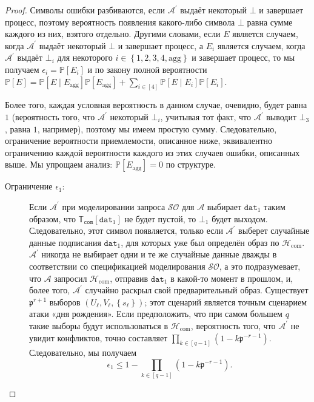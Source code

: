 \documentclass{mrl}
\theoremstyle{definition}
\numberwithin{theorem}{subsection}
\newcommand{\adversary}{\mathcal{A}}
\newcommand{\p}{\mathfrak{p}}
\begin{document}
\begin{proof}
Символы ошибки разбиваются, если $\adversary^\prime$ выдаёт некоторый $\bot$ и завершает процесс, поэтому вероятность появления какого-либо символа $\bot$ равна сумме каждого из них, взятого отдельно. Другими словами, если $E$ является случаем, когда $\adversary^\prime$ выдаёт некоторый $\bot$ и завершает процесс, а $E_i$ является случаем, когда $\adversary^\prime$ выдаёт $\bot_i$ для некоторого $ i \in \left\{1,2,3,4,\text{agg}\right\}$ и завершает процесс, то мы получаем $\epsilon_i = \mathbb{P}[E_i]$ и по закону полной вероятности $\mathbb{P}[E] = \mathbb{P}[E \mid E_{\text{agg}}]\mathbb{P}[E_{\text{agg}}] + \sum_{i \in [4]} \mathbb{P}[E \mid E_i]\mathbb{P}[E_i]$.

Более того, каждая условная вероятность в данном случае, очевидно, будет равна $1$ (вероятность того, что $\adversary^\prime$ некоторый $\bot_i$, учитывая тот факт, что $\adversary^\prime$ выводит $\bot_3$, равна $1$, например), поэтому мы имеем простую сумму. Следовательно, ограничение вероятности приемлемости, описанное ниже, эквивалентно ограничению каждой вероятности каждого из этих случаев ошибки, описанных выше. Мы упрощаем анализ: $\mathbb{P}[E_{\text{agg}}] = 0$ по структуре.


\begin{description}
\item [Ограничение $\epsilon_1$:] Если $\adversary^\prime$ при моделировании запроса $\mathcal{SO}$ для $\adversary$ выбирает $\texttt{dat}_1$ таким образом, что $\mathbb{T}_{\texttt{com}}[\texttt{dat}_1]$ не будет пустой, то $\bot_1$ будет выходом. Следовательно, этот символ появляется, только если $\adversary^\prime$ выберет случайные данные подписания $\texttt{dat}_1$, для которых уже был определён образ по $\mathcal{H}_{\text{com}}$. $\adversary^\prime$ никогда не выбирает одни и те же случайные данные дважды в соответствии со спецификацией моделирования $\mathcal{SO}$, а это подразумевает, что $\adversary$ запросил $\mathcal{H}_{\text{com}}$, отправив $\texttt{dat}_1$ в какой-то момент в прошлом, и, более того, $\adversary^\prime$ случайно раскрыл свой предварительный образ. Существует $\p^{r+1}$ выборов $(U_\ell, V_\ell, \left\{s_\ell\right\})$; этот сценарий является точным сценарием атаки «дня рождения». Если предположить, что при самом большем $q$ такие выборы будут использоваться в $\mathcal{H}_{\text{com}}$, вероятность того, что $\adversary^\prime$ не увидит конфликтов, точно составляет $\prod_{k \in [q-1]}(1 - k\mathfrak{p}^{-r-1})$. Следовательно, мы получаем
\[\epsilon_1 \leq 1 - \prod_{k \in [q-1]}(1 - k\mathfrak{p}^{-r-1}).\]


\end{description}
\end{proof}
\end{document}
